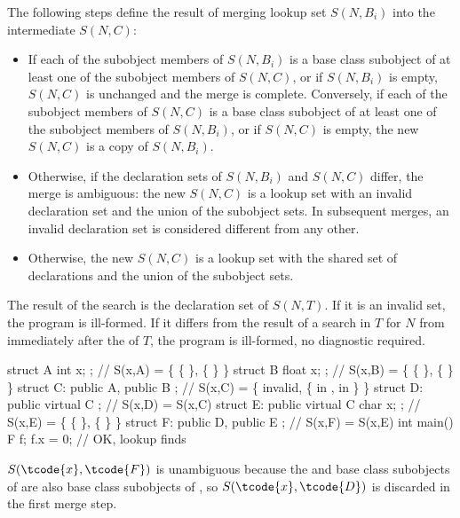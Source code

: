 \pnum
The following steps define the result of merging lookup set $S(N,B_i)$
into the intermediate $S(N,C)$:

\begin{itemize}
\item If each of the subobject members of $S(N,B_i)$ is a base class
subobject of at least one of the subobject members of $S(N,C)$, or if
$S(N,B_i)$ is empty, $S(N,C)$ is unchanged and the merge is complete.
Conversely, if each of the subobject members of $S(N,C)$ is a base class
subobject of at least one of the subobject members of $S(N,B_i)$, or if
$S(N,C)$ is empty, the new $S(N,C)$ is a copy of $S(N,B_i)$.

\item Otherwise, if the declaration sets of $S(N,B_i)$ and $S(N,C)$
differ, the merge is ambiguous: the new $S(N,C)$ is a lookup set with an
invalid declaration set and the union of the subobject sets. In
subsequent merges, an invalid declaration set is considered different
from any other.

\item Otherwise, the new $S(N,C)$ is a lookup set with the shared set of
declarations and the union of the subobject sets.
\end{itemize}

\pnum
The result of the search is the declaration set of $S(N,T)$.
If it is an invalid set, the program is ill-formed.
If it differs from the result of a search in $T$ for $N$
from immediately after the  of $T$,
the program is ill-formed, no diagnostic required.
\begin{example}
\begin{codeblock}
struct A { int x; };                    // S(x,A) = \{ \{  \}, \{  \} \}
struct B { float x; };                  // S(x,B) = \{ \{  \}, \{  \} \}
struct C: public A, public B { };       // S(x,C) = \{ invalid, \{  in ,  in  \} \}
struct D: public virtual C { };         // S(x,D) = S(x,C)
struct E: public virtual C { char x; }; // S(x,E) = \{ \{  \}, \{  \} \}
struct F: public D, public E { };       // S(x,F) = S(x,E)
int main() {
  F f;
  f.x = 0;                              // OK, lookup finds 
}
\end{codeblock}

$S(\tcode{x},\tcode{F})$ is unambiguous because the  and  base
class subobjects of  are also base class subobjects of , so
$S(\tcode{x},\tcode{D})$ is discarded in the first merge step.
\end{example}

